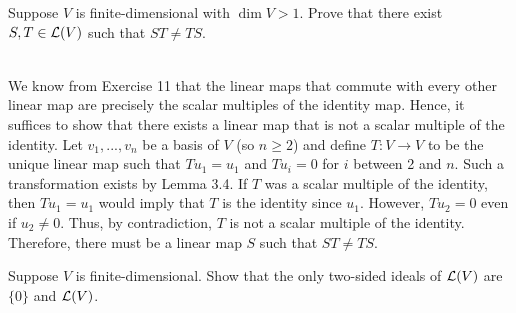 \begin{exercise}
    Suppose $V$ is finite-dimensional with $\dim V > 1$. Prove that there exist $S,T \in \mathcal{L}(V)$ such that $ST \neq TS$. \\
\end{exercise}

\begin{solution}
    \\ We know from Exercise 11 that the linear maps that commute with every other linear map are precisely the scalar multiples of the identity map. Hence, it suffices to show that there exists a linear map that is not a scalar multiple of the identity. Let $v_1, ..., v_n$ be a basis of $V$ (so $n \geq 2$) and define $T : V \to V$ to be the unique linear map such that $Tu_1 = u_1$ and $Tu_i = 0$ for $i$ between 2 and $n$. Such a transformation exists by Lemma 3.4. If $T$ was a scalar multiple of the identity, then $Tu_1 = u_1$ would imply that $T$ is the identity since $u_1$. However, $Tu_2 = 0$ even if $u_2 \neq 0$. Thus, by contradiction, $T$ is not a scalar multiple of the identity. Therefore, there must be a linear map $S$ such that $ST \neq TS$.\\
\end{solution}

\begin{exercise}
    Suppose $V$ is finite-dimensional. Show that the only two-sided ideals of $\mathcal{L}(V)$ are $\{0\}$ and $\mathcal{L}(V)$. \\
\end{exercise}

